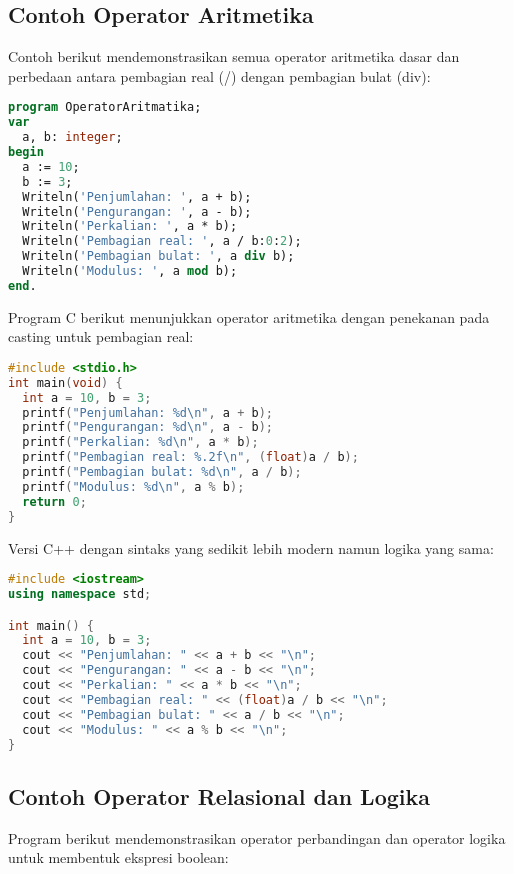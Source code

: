\documentclass[../main.tex]{subfiles}
\begin{document}
\subsection{Contoh Operator Aritmetika}

Contoh berikut mendemonstrasikan semua operator aritmetika dasar dan perbedaan antara pembagian real (/) dengan pembagian bulat (div):

\begin{lstlisting}[language=Pascal, caption={Operator aritmetika di Pascal}]
program OperatorAritmatika;
var
  a, b: integer;
begin
  a := 10;
  b := 3;
  Writeln('Penjumlahan: ', a + b);
  Writeln('Pengurangan: ', a - b);
  Writeln('Perkalian: ', a * b);
  Writeln('Pembagian real: ', a / b:0:2);
  Writeln('Pembagian bulat: ', a div b);
  Writeln('Modulus: ', a mod b);
end.
\end{lstlisting}

Program C berikut menunjukkan operator aritmetika dengan penekanan pada casting untuk pembagian real:

\begin{lstlisting}[language=C, caption={Operator aritmetika di C}]
#include <stdio.h>
int main(void) {
  int a = 10, b = 3;
  printf("Penjumlahan: %d\n", a + b);
  printf("Pengurangan: %d\n", a - b);
  printf("Perkalian: %d\n", a * b);
  printf("Pembagian real: %.2f\n", (float)a / b);
  printf("Pembagian bulat: %d\n", a / b);
  printf("Modulus: %d\n", a % b);
  return 0;
}
\end{lstlisting}

Versi C++ dengan sintaks yang sedikit lebih modern namun logika yang sama:

\begin{lstlisting}[language=C++, caption={Operator aritmetika di C++}]
#include <iostream>
using namespace std;

int main() {
  int a = 10, b = 3;
  cout << "Penjumlahan: " << a + b << "\n";
  cout << "Pengurangan: " << a - b << "\n";
  cout << "Perkalian: " << a * b << "\n";
  cout << "Pembagian real: " << (float)a / b << "\n";
  cout << "Pembagian bulat: " << a / b << "\n";
  cout << "Modulus: " << a % b << "\n";
}
\end{lstlisting}

\subsection{Contoh Operator Relasional dan Logika}

Program berikut mendemonstrasikan operator perbandingan dan operator logika untuk membentuk ekspresi boolean:
\end{document}
